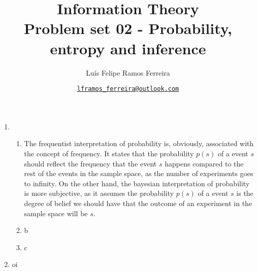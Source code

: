 \documentclass{article}
\title{Information Theory \\ \large Problem set 02 - Probability, entropy and inference}
\author{Luís Felipe Ramos Ferreira}
\date{\href{mailto:lframos\_ferreira@outlook.com}{\texttt{lframos\_ferreira@outlook.com}}
}
\begin{document}
\maketitle

\begin{enumerate}
  \item \begin{enumerate}
          \item The frequentist interpretation of probability is, obviously, associated with the concept of frequency. It states that the probability \(p(s)\) of a event \(s\) should reflect the frequency that the event \(s\) happens compared to the rest of the events in the sample space, as the number of experiments goes to infinity. On the other hand, the bayesian interpretation of probability is more subjective, as it assumes the probability \(p(s)\) of a event \(s\) is the degree of belief we should have that the outcome of an experiment in the sample space will be \(s\).
      \item b
      \item c
  \end{enumerate}

\item oi
\end{enumerate}
\end{document}
